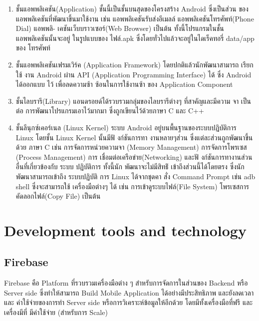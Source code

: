 \begin{enumerate}
    \item ชั้นแอพพลิเคชัน(Application) ชั้นนี้เป็นชั้นบนสุดของโครงสร้าง Android ซึ่งเป็นส่วน ของแอพพลิเคชันที่พัฒนาขึ้นมาใช้งาน เช่น แอพพลิเคชันรับส่งอีเมลล์ แอพพลิเคชันโทรศัพท์(Phone Dial) แอพพลิ-
    เคชันเว็บบราวเซอร์(Web Browser) เป็นต้น ทั้งนี้โปรแกรมในชั้น แอพพลิเคชันนั้นจะอยู่ ในรูปแบบของ
    ไฟล์.apk ซึ่งโดยทั่วไปแล้วจะอยู่ในไดเร็คทอรี่ data/app ของ โทรศัพท์
    
    \item ชั้นแอพพลิเคชันเฟรมเวิร์ค (Application Framework) โดยปกติแล้วนักพัฒนาสามารถ เรียกใช้
    งาน Android ผ่าน API (Application Programming Interface) ได้ ซึ่ง Android ได้ออกแบบ ไว้
    เพื่อลดความซ้า ซ้อนในการใช้งานซ้า ของ Application Component
    \item ชั้นไลบรารี(Library) แอนดรอยด์ได้รวบรวมกลุ่มของไลบรารีต่างๆ ที่สาคัญและมีความ จา เป็นต่อ
    การพัฒนาโปรแกรมเอาไว้มากมา ซึ่งถูกเขียนไว้ด้วยภาษา C และ C++

    \item ชั้นลีนุกซ์เคอร์เนล (Linux Kernel) ระบบ Android อยู่บนพื้นฐานของระบบปฏิบัติการ Linux
    โดยชั้น Linux Kernel นั้นมีฟั งก์ชันการทา งานหลายๆส่วน ซึ่งแต่ละส่วนถูกพัฒนาขึ้นด้วย ภาษา C เช่น
    การจัดการหน่วยความจา (Memory Management) การจัดการโพรเซส (Process Management) การ
    เชื่อมต่อเครือข่าย(Networking) และฟั งก์ชันการทางานส่วนอื่นที่เกี่ยวข้องกับ ระบบ ปฏิบัติการ ทั้งนี้นัก
    พัฒนาจะไม่มีสิทธ์ิ
    เข้าถึงส่วนนี้ได้โดยตรง ซึ่งนักพัฒนาสามารถเข้าถึง ระบบปฏิบัติ การ Linux ได้จากชุดคา
    สั่ง Command Prompt เช่น adb shell ซึ่งจะสามารถใช้ เครื่องมือต่างๆ ได้ เช่น การเข้าดูระบบไฟล์(File
    System) โพรเซสการคัดลอกไฟล์(Copy File) เป็นต้น
    
\end{enumerate}
\section{Development tools and technology}
\subsection{Firebase}
\quad \quad Firebase \cite{firebase} คือ Platform ที่รวบรวมเครื่องมือต่าง ๆ สําหรับการจัดการในส่วนของ Backend หรือ
Server side ซึ่งทําให้สามารถ Build Mobile Application ได้อย่างมีประสิทธิภาพ และยังลดเวลาและ
ค่าใช้จ่ายของการทํา Server side หรือการวิเคราะห์ข้อมูลให้อีกด้วย โดยมีทั้งเครื่องมือที่ฟรี และเครื่องมีที่
มีค่าใช้จ่าย (สําหรับการ Scale)

